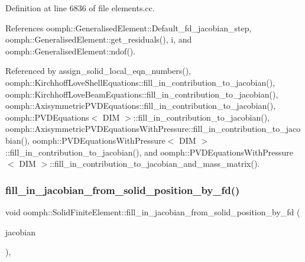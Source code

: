 Definition at line 6836 of file elements.\+cc.



References oomph\+::\+Generalised\+Element\+::\+Default\+\_\+fd\+\_\+jacobian\+\_\+step, oomph\+::\+Generalised\+Element\+::get\+\_\+residuals(), i, and oomph\+::\+Generalised\+Element\+::ndof().



Referenced by assign\+\_\+solid\+\_\+local\+\_\+eqn\+\_\+numbers(), oomph\+::\+Kirchhoff\+Love\+Shell\+Equations\+::fill\+\_\+in\+\_\+contribution\+\_\+to\+\_\+jacobian(), oomph\+::\+Kirchhoff\+Love\+Beam\+Equations\+::fill\+\_\+in\+\_\+contribution\+\_\+to\+\_\+jacobian(), oomph\+::\+Axisymmetric\+P\+V\+D\+Equations\+::fill\+\_\+in\+\_\+contribution\+\_\+to\+\_\+jacobian(), oomph\+::\+P\+V\+D\+Equations$<$ D\+I\+M $>$\+::fill\+\_\+in\+\_\+contribution\+\_\+to\+\_\+jacobian(), oomph\+::\+Axisymmetric\+P\+V\+D\+Equations\+With\+Pressure\+::fill\+\_\+in\+\_\+contribution\+\_\+to\+\_\+jacobian(), oomph\+::\+P\+V\+D\+Equations\+With\+Pressure$<$ D\+I\+M $>$\+::fill\+\_\+in\+\_\+contribution\+\_\+to\+\_\+jacobian(), and oomph\+::\+P\+V\+D\+Equations\+With\+Pressure$<$ D\+I\+M $>$\+::fill\+\_\+in\+\_\+contribution\+\_\+to\+\_\+jacobian\+\_\+and\+\_\+mass\+\_\+matrix().

\mbox{\label{classoomph_1_1SolidFiniteElement_a3708a6f6b9b616ff44fa8b55cdbd0d34}} 
\subsubsection{\texorpdfstring{fill\+\_\+in\+\_\+jacobian\+\_\+from\+\_\+solid\+\_\+position\+\_\+by\+\_\+fd()}{fill\_in\_jacobian\_from\_solid\_position\_by\_fd()}\hspace{0.1cm}{\footnotesize\ttfamily [2/2]}}
{\footnotesize\ttfamily void oomph\+::\+Solid\+Finite\+Element\+::fill\+\_\+in\+\_\+jacobian\+\_\+from\+\_\+solid\+\_\+position\+\_\+by\+\_\+fd (\begin{DoxyParamCaption}\item[{\hyperlink{classoomph_1_1DenseMatrix}{Dense\+Matrix}$<$ double $>$ \&}]{jacobian }\end{DoxyParamCaption})\hspace{0.3cm}{\ttfamily [inline]}, {\ttfamily [protected]}}



